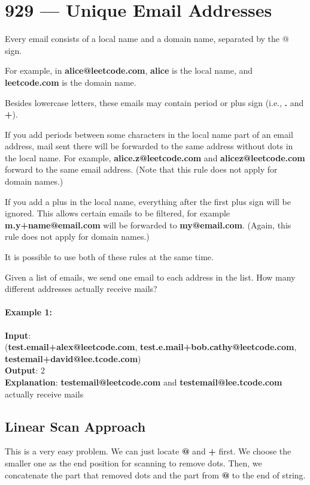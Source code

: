 \section{929 --- Unique Email Addresses}
Every email consists of a local name and a domain name, separated by the @ sign.
\par
For example, in \textbf{alice@leetcode.com}, \textbf{alice} is the local name, and \textbf{leetcode.com} is the domain name.
\par
Besides lowercase letters, these emails may contain period or plus sign (i.e., \textbf{.} and \textbf{+}).
\par
If you add periods between some characters in the local name part of an email address, mail sent there will be forwarded to the same address without dots in the local name.  For example, \textbf{alice.z@leetcode.com} and \textbf{alicez@leetcode.com} forward to the same email address.  (Note that this rule does not apply for domain names.)
\par
If you add a plus in the local name, everything after the first plus sign will be ignored. This allows certain emails to be filtered, for example \textbf{m.y+name@email.com} will be forwarded to \textbf{my@email.com}.  (Again, this rule does not apply for domain names.)
\par
It is possible to use both of these rules at the same time.
\par
Given a list of emails, we send one email to each address in the list.  How many different addresses actually receive mails? 
\paragraph{Example 1:}
\begin{flushleft}
\textbf{Input}:
\\(\textbf{test.email+alex@leetcode.com}, \textbf{test.e.mail+bob.cathy@leetcode.com}, \textbf{testemail+david@lee.tcode.com})
\\
\textbf{Output}: 2
\\
\textbf{Explanation}: \textbf{testemail@leetcode.com} and \textbf{testemail@lee.tcode.com} actually receive mails
\end{flushleft}
\subsection{Linear Scan Approach}
This is a very easy problem. We can just locate \textbf{@} and \textbf{+} first. We choose the smaller one as the end position for scanning to remove dots. Then, we concatenate the part that removed dots and the part from \textbf{@} to the end of string.




